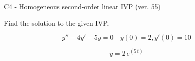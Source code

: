 \begin{exercise}
  \begin{exerciseTitle}C4 - Homogeneous second-order linear IVP (ver. 55)\end{exerciseTitle}
  \begin{exerciseStatement}
    
Find the solution to the given IVP.

    
\[y''-4y'-5y = 0 \hspace{1em} y(0) = 2 , y'(0) = 10\]

  \end{exerciseStatement}
  \begin{exerciseAnswer}
    
\[y= 2 \, e^{\left(5 \, t\right)}\]

  \end{exerciseAnswer}
\end{exercise}